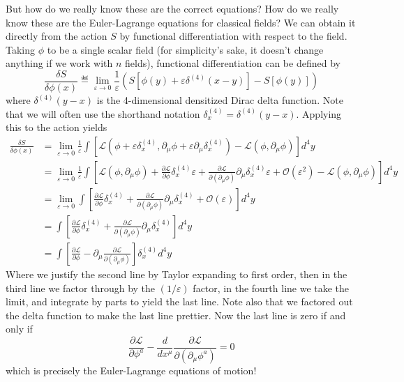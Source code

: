 But how do we really know these are the correct equations? How do
we really know these are the Euler-Lagrange equations for
classical fields?  We can obtain it directly from the action $S$
by functional differentiation with respect to the field. Taking
$\phi$ to be a single scalar field (for simplicity's sake, it
doesn't change anything if we work with $n$ fields), functional
differentiation can be defined by
\begin{equation}%
\frac{\delta S}{\delta\phi(x)}\eqdef
\lim_{\varepsilon\to0}\frac{1}{\varepsilon}\left(S\left[\phi(y)+\varepsilon\delta^{(4)}(x-y)\right]-S\left[\phi(y)\right]\right)
\end{equation}
where $\delta^{(4)}(y-x)$ is the 4-dimensional densitized Dirac
delta function. Note that we will often use the shorthand
notation $\delta^{(4)}_{x}=\delta^{(4)}(y-x)$. Applying this to the action yields
\begin{subequations}
\begin{align}
\frac{\delta S}{\delta\phi(x)} &= \lim_{\varepsilon\to0}\frac{1}{\varepsilon}\int\left[\mathcal{L}\left(\phi+\varepsilon\delta^{(4)}_{x},\partial_{\mu}\phi+\varepsilon\partial_{\mu}\delta^{(4)}_{x}\right)-\mathcal{L}(\phi,\partial_{\mu}\phi)\right]d^{4}y\\
&=\lim_{\varepsilon\to0}\frac{1}{\varepsilon}\int\left[\mathcal{L}(\phi,\partial_{\mu}\phi)+\frac{\partial\mathcal{L}}{\partial\phi}\delta^{(4)}_{x}\varepsilon+\frac{\partial\mathcal{L}}{\partial(\partial_{\mu}\phi)}\partial_{\mu}\delta^{(4)}_{x}\varepsilon+\mathcal{O}(\varepsilon^{2})-\mathcal{L}(\phi,\partial_{\mu}\phi)\right]d^{4}y\\
&= \lim_{\varepsilon\to0}\int\left[\frac{\partial\mathcal{L}}{\partial\phi}\delta^{(4)}_{x}+\frac{\partial\mathcal{L}}{\partial(\partial_{\mu}\phi)}\partial_{\mu}\delta^{(4)}_{x}+\mathcal{O}(\varepsilon)\right]d^{4}y\\
&=\int\left[\frac{\partial\mathcal{L}}{\partial\phi}\delta^{(4)}_{x}+\frac{\partial\mathcal{L}}{\partial(\partial_{\mu}\phi)}\partial_{\mu}\delta^{(4)}_{x}\right]d^{4}y\\
&=\int\left[\frac{\partial\mathcal{L}}{\partial\phi}-\partial_{\mu}\frac{\partial\mathcal{L}}{\partial(\partial_{\mu}\phi)}\right]\delta^{(4)}_{x}d^{4}y
\end{align}
\end{subequations}
Where we justify the second line by Taylor expanding to first
order, then in the third line we factor through by the
$(1/\varepsilon)$ factor, in the fourth line we take the limit,
and integrate by parts to yield the last line. Note also that we
factored out the delta function to make the last line
prettier. Now the last line is zero if and only if
\begin{equation}%
\frac{\partial\mathcal{L}}{\partial\phi^{a}}-\frac{d}{dx^{\mu}}\frac{\partial\mathcal{L}}{\partial (\partial_{\mu}\phi^{a})}=0
\end{equation}
which is precisely the Euler-Lagrange equations of motion!

